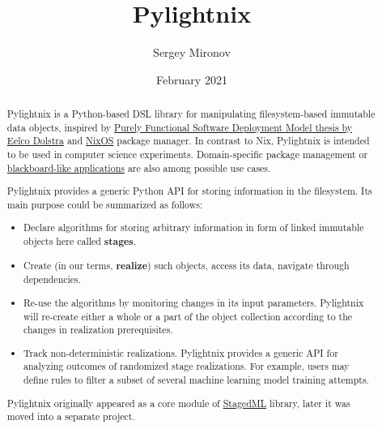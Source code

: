 \documentclass{article}
\begin{document}
\newenvironment{shellcode}
  {\VerbatimEnvironment\begin{verbatim}}
  {\end{verbatim}}
\newenvironment{pythoncode}
  {\VerbatimEnvironment\begin{verbatim}}
  {\end{verbatim}}


\title{Pylightnix}
\author{Sergey Mironov}
\date{February 2021}
\maketitle


\begin{abstract}

Pylightnix is a Python-based DSL library for manipulating filesystem-based
immutable data objects, inspired by
\href{https://edolstra.github.io/pubs/phd-thesis.pdf}{Purely Functional Software
Deployment Model thesis by Eelco Dolstra} and \href{https://nixos.org}{NixOS}
package manager. In contrast to Nix, Pylightnix is intended to be used in
computer science experiments. Domain-specific package management or
\href{https://en.wikipedia.org/wiki/Blackboard_design_pattern}{blackboard-like
applications} are also among possible use cases.

Pylightnix provides a generic Python API for storing information in the
filesystem. Its main purpose could be summarized as follows:
\begin{itemize}
  \item Declare algorithms for storing arbitrary information in form of linked
    immutable objects here called \textbf{stages}.
  \item Create (in our terms, \textbf{realize}) such objects, access its data,
    navigate through dependencies.
  \item Re-use the algorithms by monitoring changes in its input
    parameters. Pylightnix will re-create either a whole or a part of the object
    collection according to the changes in realization prerequisites.
  \item Track non-deterministic realizations. Pylightnix provides a generic API
    for analyzing outcomes of randomized stage realizations. For example, users
    may define rules to filter a subset of several machine learning model
    training attempts.
\end{itemize}

Pylightnix originally appeared as a core module of
\href{https://github.com/stagedml/stagedml}{StagedML} library, later it was
moved into a separate project.

\end{abstract}
\end{document}

